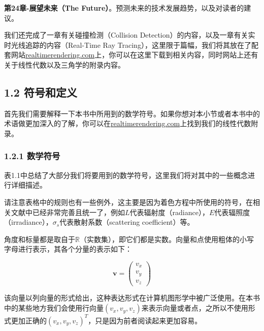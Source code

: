 \documentclass[
  paper=a4,
  ,captions=tableheading
]{scrartcl}
\begin{document}
\textbf{第24章-展望未来（The
Future）}。预测未来的技术发展趋势，以及对读者的建议。

我们还完成了一章有关碰撞检测（Collision
Detection）的内容，以及一章有关实时光线追踪的内容（Real-Time Ray
Tracing），这里限于篇幅，我们将其放在了配套网站\href{http://realtimerendering.com}{realtimerendering.com}上，你可以在这里下载到相关内容，同时网站上还有关于线性代数以及三角学的附录内容。

\subsection{1.2 符号和定义}\label{ux7b26ux53f7ux548cux5b9aux4e49}

首先我们需要解释一下本书中所用到的数学符号。如果你想对本小节或者本书中的术语做更加深入的了解，你可以在\href{http://realtimerendering.com}{realtimerendering.com}上找到我们的线性代数附录。

\subsubsection{1.2.1 数学符号}\label{ux6570ux5b66ux7b26ux53f7}

表1.1中总结了大部分我们将要用到的数学符号，这里我们将对其中的一些概念进行详细描述。

请注意表格中的规则也有一些例外，这主要是因为着色方程中所使用的符号，在相关文献中已经非常完善且统一了，例如\(L\)代表辐射度（radiance），\(E\)代表辐照度（irradiance），\(\sigma_s\)代表散射系数（scattering
coefficient）等。

角度和标量都是取自于\(\mathbb{R}\)（实数集），即它们都是实数。向量和点使用粗体的小写字母进行表示，其各个分量的表示如下：

\[
\mathbf{v} = \left(  \begin{array}{} v_x \\ v_y \\ v_z \end{array} \right)
\]

该向量以列向量的形式给出，这种表达形式在计算机图形学中被广泛使用。在本书中的某些地方我们会使用行向量\((v_x, v_y, v_z)\)来表示向量或者点，之所以不使用形式更加正确的\((v_x, v_y, v_z)^T\)，只是因为前者阅读起来更加容易。
\end{document}
